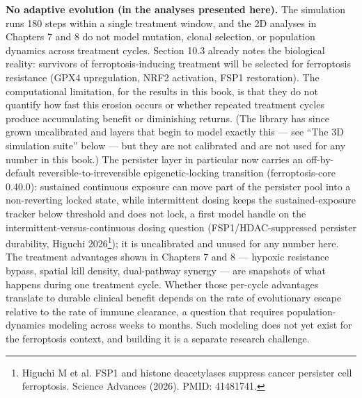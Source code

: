 \documentclass[11pt,twoside,openright]{report}
\begin{document}
\textbf{No adaptive evolution (in the analyses presented here).} The simulation runs 180 steps within a single treatment window, and the 2D analyses in Chapters 7 and 8 do not model mutation, clonal selection, or population dynamics across treatment cycles. Section 10.3 already notes the biological reality: survivors of ferroptosis-inducing treatment will be selected for ferroptosis resistance (GPX4 upregulation, NRF2 activation, FSP1 restoration). The computational limitation, for the results in this book, is that they do not quantify how fast this erosion occurs or whether repeated treatment cycles produce accumulating benefit or diminishing returns. (The library has since grown uncalibrated  and  layers that begin to model exactly this --- see ``The 3D simulation suite'' below --- but they are not calibrated and are not used for any number in this book.) The persister layer in particular now carries an off-by-default reversible-to-irreversible epigenetic-locking transition (ferroptosis-core 0.40.0): sustained continuous exposure can move part of the persister pool into a non-reverting locked state, while intermittent dosing keeps the sustained-exposure tracker below threshold and does not lock, a first model handle on the intermittent-versus-continuous dosing question (FSP1/HDAC-suppressed persister durability, Higuchi 2026\footnote{Higuchi M et al. FSP1 and histone deacetylases suppress cancer persister cell ferroptosis. Science Advances (2026). PMID: 41481741.}); it is uncalibrated and unused for any number here. The treatment advantages shown in Chapters 7 and 8 --- hypoxic resistance bypass, spatial kill density, dual-pathway synergy --- are snapshots of what happens during one treatment cycle. Whether those per-cycle advantages translate to durable clinical benefit depends on the rate of evolutionary escape relative to the rate of immune clearance, a question that requires population-dynamics modeling across weeks to months. Such modeling does not yet exist for the ferroptosis context, and building it is a separate research challenge.
\end{document}
